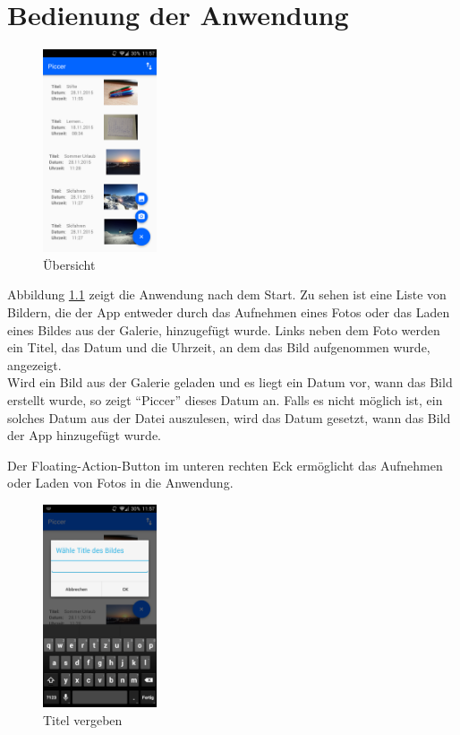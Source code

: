 
\chapter{Bedienung der Anwendung}
\begin{figure}[H]
\label{Bild1}
\centering
\includegraphics[width=0.3\textwidth]{images/bild_1}
\caption{Übersicht}
\end{figure}
Abbildung \ref{Bild1} zeigt die Anwendung nach dem Start. Zu sehen ist eine Liste von Bildern, die der App entweder durch das Aufnehmen eines Fotos oder das Laden eines Bildes
aus der Galerie, hinzugefügt wurde. Links neben dem Foto werden ein Titel, das Datum und die Uhrzeit, an dem das Bild aufgenommen wurde, angezeigt. \\
Wird ein Bild aus der Galerie geladen und es liegt ein Datum vor, wann das Bild erstellt wurde, so zeigt \enquote{Piccer} dieses Datum an. Falls es nicht möglich ist, ein solches
Datum aus der Datei auszulesen, wird das Datum gesetzt, wann das Bild der App hinzugefügt wurde.

Der Floating-Action-Button im unteren rechten Eck ermöglicht das Aufnehmen oder Laden von Fotos in die Anwendung.

\begin{figure}[H]
\label{Bild2}
\centering
\includegraphics[width=0.3\textwidth]{images/bild_2}
\caption{Titel vergeben}
\end{figure}

